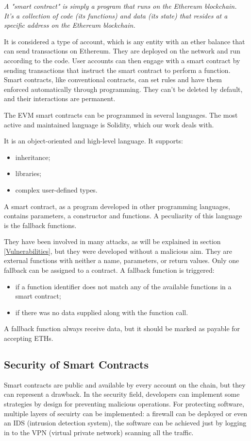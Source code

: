 \documentclass[a4paper,sigconf, language=french,
language=german, language=spanish, language=english]{acmart}
\begin{document}
\textit{A "smart contract" is simply a program that runs on the Ethereum blockchain. It's a collection of code (its functions) and data (its state) that resides at a specific address on the Ethereum blockchain.}

It is considered a type of account, which is any entity with an ether balance that can send transactions on Ethereum. 
They are deployed on the network and run according to the code. User accounts can then engage with a smart contract by sending transactions that instruct the smart contract to perform a function. 
Smart contracts, like conventional contracts, can set rules and have them enforced automatically through programming.
They can't be deleted by default, and their interactions are permanent. 

The EVM smart contracts can be programmed in several languages. The most active and maintained language is Solidity, which our work deals with. 

It is an object-oriented and high-level language. It supports:
\begin{itemize}
  \item inheritance;
  \item libraries;
  \item complex user-defined types.
\end{itemize}

A smart contract, as a program developed in other programming languages, contains parameters, a constructor and functions. A peculiarity of this language is the fallback functions. 

They have been involved in many attacks, as will be explained in section \ref{Vulnerabilities}, but they were developed without a malicious aim. 
They are external functions with neither a name, parameters, or return values. Only one fallback can be assigned to a contract. 
A fallback function is triggered:
\begin{itemize}
  \item if a function identifier does not match any of the available functions in a smart contract;
  \item if there was no data supplied along with the function call.
\end{itemize}

A fallback function always receive data, but it should be marked as payable for accepting ETHs. 


\subsection{Security of Smart Contracts}
Smart contracts are public and available by every account on the chain, but they can represent a drawback. In the security field, developers can implement some strategies by design for preventing malicious operations. For protecting software, multiple layers of secuirty can be implemented: a firewall can be deployed or even an IDS (intrusion detection system), the software can be achieved just by logging in to the VPN (virtual private network) scanning all the traffic.
\end{document}
